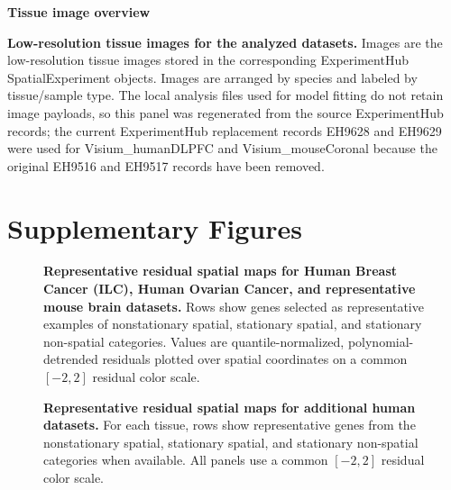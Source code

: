 \begin{landscape}
\begin{center}
\textbf{Tissue image overview}\\[4pt]

\small
\textbf{Low-resolution tissue images for the analyzed datasets.} Images are the low-resolution tissue images stored in the corresponding ExperimentHub SpatialExperiment objects. Images are arranged by species and labeled by tissue/sample type. The local analysis files used for model fitting do not retain image payloads, so this panel was regenerated from the source ExperimentHub records; the current ExperimentHub replacement records EH9628 and EH9629 were used for Visium\_humanDLPFC and Visium\_mouseCoronal because the original EH9516 and EH9517 records have been removed.
\end{center}
\end{landscape}

\clearpage
\section{Supplementary Figures}

\begin{landscape}
\begin{figure}[H]
\centering
{}
\caption{\textbf{Representative residual spatial maps for Human Breast Cancer (ILC), Human Ovarian Cancer, and representative mouse brain datasets.} Rows show genes selected as representative examples of nonstationary spatial, stationary spatial, and stationary non-spatial categories. Values are quantile-normalized, polynomial-detrended residuals plotted over spatial coordinates on a common \([-2,2]\) residual color scale.}
\label{fig:s1}
\end{figure}
\end{landscape}

\begin{landscape}
\begin{figure}[H]
\centering
{}
\caption{\textbf{Representative residual spatial maps for additional human datasets.} For each tissue, rows show representative genes from the nonstationary spatial, stationary spatial, and stationary non-spatial categories when available. All panels use a common \([-2,2]\) residual color scale.}
\label{fig:s2}
\end{figure}
\end{landscape}

